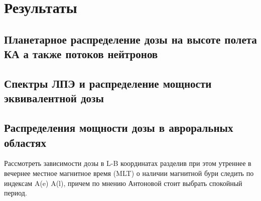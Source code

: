 
\chapter{Результаты}\label{chapt_results}


\section{Планетарное распределение дозы на высоте полета КА а также потоков нейтронов}

\section{Спектры ЛПЭ и распределение мощности эквивалентной дозы}


\section{Распределения мощности дозы в авроральных областях}

Рассмотреть зависимости дозы в L-B координатах разделив при этом утреннее в вечернее местное магнитное время (MLT) о наличии магнитной бури следить по индексам A(e) A(l), причем по мнению Антоновой стоит выбрать спокойный период.